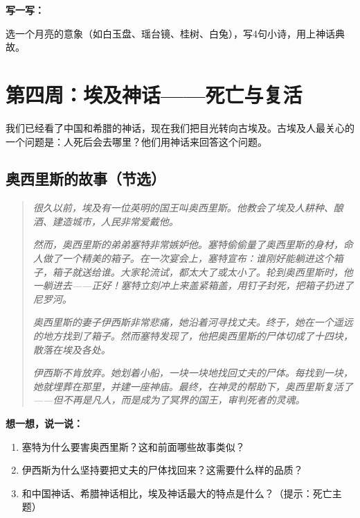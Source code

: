 \documentclass[a4paper,12pt]{ctexart}
\newcommand{\thinktitle}{%
  \vspace{0.3cm}
  {\large\textcolor{orange!80!black}{\textbf{想一想，说一说：}}}
}
\newcommand{\writetitle}{%
  \vspace{0.3cm}
  {\large\textcolor{blue!70!black}{\textbf{写一写：}}}
}
\begin{document}
\writetitle
\vspace{0.1cm}
选一个月亮的意象（如白玉盘、瑶台镜、桂树、白兔），写4句小诗，用上神话典故。

\newpage

\section*{\textcolor{orange!80!black}{第四周：埃及神话——死亡与复活}}

我们已经看了中国和希腊的神话，现在我们把目光转向古埃及。古埃及人最关心的一个问题是：人死后会去哪里？他们用神话来回答这个问题。

\vspace{0.5cm}

\subsection*{\textcolor{teal!80!black}{奥西里斯的故事（节选）}}

\begin{quote}
\textit{很久以前，埃及有一位英明的国王叫奥西里斯。他教会了埃及人耕种、酿酒、建造城市，人民非常爱戴他。}

\textit{然而，奥西里斯的弟弟塞特非常嫉妒他。塞特偷偷量了奥西里斯的身材，命人做了一个精美的箱子。在一次宴会上，塞特宣布：谁刚好能躺进这个箱子，箱子就送给谁。大家轮流试，都太大了或太小了。轮到奥西里斯时，他一躺进去——正好！塞特立刻冲上来盖紧箱盖，用钉子封死，把箱子扔进了尼罗河。}

\textit{奥西里斯的妻子伊西斯非常悲痛，她沿着河寻找丈夫。终于，她在一个遥远的地方找到了箱子。然而塞特发现了，他把奥西里斯的尸体切成了十四块，散落在埃及各处。}

\textit{伊西斯不肯放弃。她划着小船，一块一块地找回丈夫的尸体。每找到一块，她就埋葬在那里，并建一座神庙。最终，在神灵的帮助下，奥西里斯复活了——但不再是凡人，而是成为了冥界的国王，审判死者的灵魂。}
\end{quote}

\vspace{0.3cm}

\thinktitle
\begin{enumerate}
  \item 塞特为什么要害奥西里斯？这和前面哪些故事类似？
  \item 伊西斯为什么坚持要把丈夫的尸体找回来？这需要什么样的品质？
  \item 和中国神话、希腊神话相比，埃及神话最大的特点是什么？（提示：死亡主题）
\end{enumerate}
\end{document}
